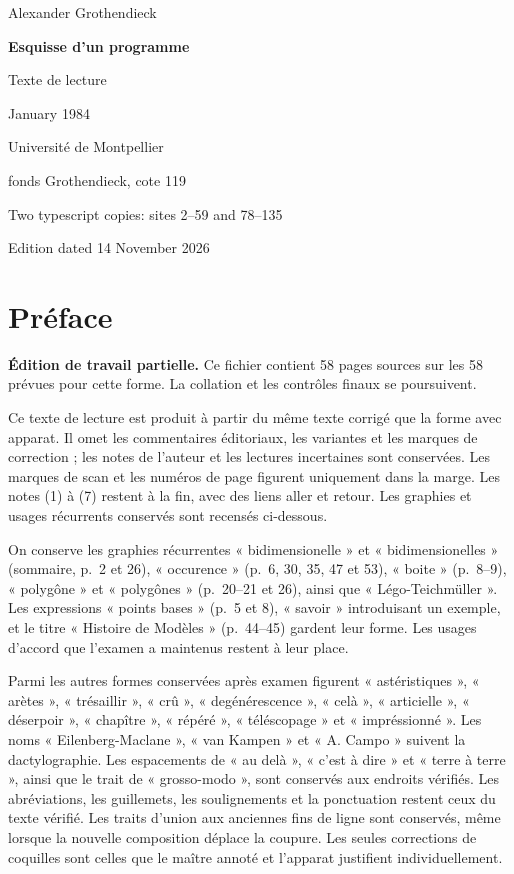 \documentclass[11pt,a4paper]{article}
\newcommand{\EditionTitle}{Esquisse d'un programme}
\newcommand{\EditionForm}{Texte de lecture}
\begin{document}
\begin{titlepage}
\centering
\vspace*{18mm}
{\Large Alexander Grothendieck\par}
\vspace{12mm}
{\Huge\bfseries\EditionTitle\par}
\vspace{8mm}
{\Large\EditionForm\par}
\vspace{14mm}
{\large January 1984\par}
\vfill
{\large Université de Montpellier\par fonds Grothendieck, cote 119\par}
\vspace{8mm}
{\normalsize Two typescript copies: sites 2--59 and 78--135\par}
\vspace{8mm}
{\normalsize Edition dated 14 November 2026\par}
\end{titlepage}
\thispagestyle{plain}
\section*{Préface}
\noindent\textbf{Édition de travail partielle.} Ce fichier contient 58 pages sources sur les 58 prévues pour cette forme. La collation et les contrôles finaux se poursuivent.\par\smallskip
Ce texte de lecture est produit à partir du même texte corrigé que la forme avec apparat. Il omet les commentaires éditoriaux, les variantes et les marques de correction ; les notes de l’auteur et les lectures incertaines sont conservées. Les marques de scan et les numéros de page figurent uniquement dans la marge. Les notes (1) à (7) restent à la fin, avec des liens aller et retour. Les graphies et usages récurrents conservés sont recensés ci-dessous. \par\smallskip
On conserve les graphies récurrentes « bidimensionelle » et
« bidimensionelles » (sommaire, p.~2 et 26), « occurence » (p.~6, 30, 35,
47 et 53), « boite » (p.~8--9), « polygône » et « polygônes » (p.~20--21
et 26), ainsi que « Légo-Teichmüller ». Les expressions « points bases »
(p.~5 et 8), « savoir » introduisant un exemple, et le titre « Histoire
de Modèles » (p.~44--45) gardent leur forme. Les usages d'accord que
l'examen a maintenus restent à leur place.
\par
Parmi les autres formes conservées après examen figurent « astéristiques »,
« arètes », « trésaillir », « crû », « degénérescence », « celà »,
« articielle », « déserpoir », « chapître », « répéré », « téléscopage »
et « impréssionné ». Les noms « Eilenberg-Maclane », « van Kampen » et « A. Campo » suivent
la dactylographie. Les espacements de « au delà », « c'est à dire »
et « terre à terre », ainsi que le trait de « grosso-modo », sont
conservés aux endroits vérifiés. Les abréviations, les guillemets,
les soulignements et la ponctuation restent ceux du texte vérifié.
Les traits d'union aux anciennes fins de ligne sont conservés, même
lorsque la nouvelle composition déplace la coupure. Les seules
corrections de coquilles sont celles que le maître annoté et l'apparat
justifient individuellement.
\end{document}
